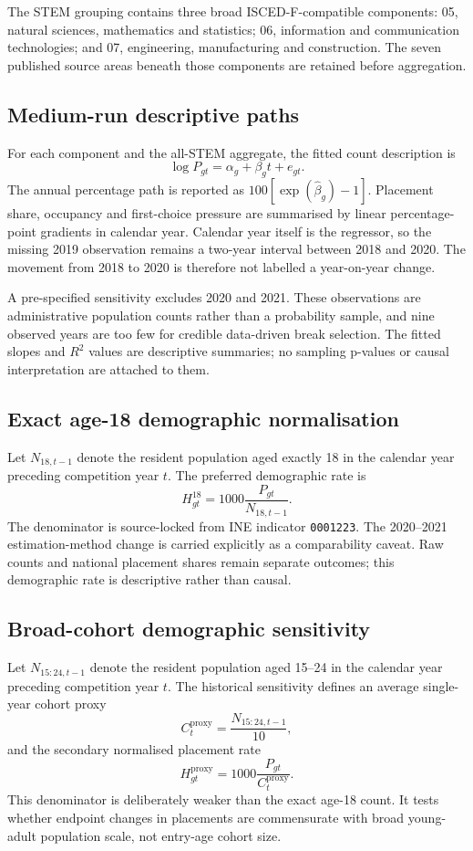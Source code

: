 \documentclass[11pt,a4paper]{article}
\begin{document}
The STEM grouping contains three broad ISCED-F-compatible components: 05, natural sciences, mathematics and statistics; 06, information and communication technologies; and 07, engineering, manufacturing and construction. The seven published source areas beneath those components are retained before aggregation.

\subsection{Medium-run descriptive paths}
For each component and the all-STEM aggregate, the fitted count description is
\[
\log P_{gt}=\alpha_g+\beta_g t+e_{gt}.
\]
The annual percentage path is reported as $100[\exp(\widehat\beta_g)-1]$. Placement share, occupancy and first-choice pressure are summarised by linear percentage-point gradients in calendar year. Calendar year itself is the regressor, so the missing 2019 observation remains a two-year interval between 2018 and 2020. The movement from 2018 to 2020 is therefore not labelled a year-on-year change.

A pre-specified sensitivity excludes 2020 and 2021. These observations are administrative population counts rather than a probability sample, and nine observed years are too few for credible data-driven break selection. The fitted slopes and $R^2$ values are descriptive summaries; no sampling p-values or causal interpretation are attached to them.

\subsection{Exact age-18 demographic normalisation}
Let $N_{18,t-1}$ denote the resident population aged exactly 18 in the calendar year preceding competition year $t$. The preferred demographic rate is
\[
H^{18}_{gt}=1000\frac{P_{gt}}{N_{18,t-1}}.
\]
The denominator is source-locked from INE indicator \texttt{0001223}. The 2020--2021 estimation-method change is carried explicitly as a comparability caveat. Raw counts and national placement shares remain separate outcomes; this demographic rate is descriptive rather than causal.

\subsection{Broad-cohort demographic sensitivity}
Let $N_{15:24,t-1}$ denote the resident population aged 15--24 in the calendar year preceding competition year $t$. The historical sensitivity defines an average single-year cohort proxy
\[
C^{\mathrm{proxy}}_t=\frac{N_{15:24,t-1}}{10},
\]
and the secondary normalised placement rate
\[
H^{\mathrm{proxy}}_{gt}=1000\frac{P_{gt}}{C^{\mathrm{proxy}}_t}.
\]
This denominator is deliberately weaker than the exact age-18 count. It tests whether endpoint changes in placements are commensurate with broad young-adult population scale, not entry-age cohort size.
\end{document}
